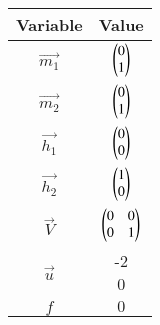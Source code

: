 \begin{tabular}[12pt]{ |c|c|}
    \hline
    \textbf{Variable} & \textbf{Value}\\ 
    \hline
	$\vec{m_1}$ & $\begin{pmatrix}0\\1\end{pmatrix}$\\
    \hline
	$\vec{m_2}$ & $\begin{pmatrix}0\\1\end{pmatrix}$\\
    \hline
	$\vec{h_1}$ & $\begin{pmatrix}0\\0\end{pmatrix}$ \\
    \hline
	$\vec{h_2}$ & $\begin{pmatrix}1\\0\end{pmatrix}$\\
    \hline
    $\vec{V}$ & $\begin{pmatrix}0 & 0\\0 & 1\end{pmatrix}$\\
    \hline
    $\vec{u}$ & \myvec{-2 \\0}\\
    \hline
    $f$ & $0$\\
    \hline
\end{tabular}
